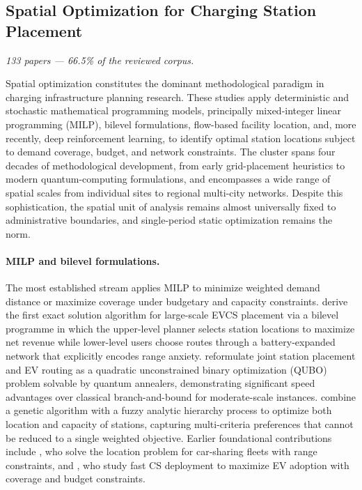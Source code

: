 \documentclass[12pt,letterpaper]{article}
\begin{document}
\subsection{Spatial Optimization for Charging Station Placement}

\textit{133 papers --- 66.5\% of the reviewed corpus.}

Spatial optimization constitutes the dominant methodological paradigm in
charging infrastructure planning research.  These studies apply
deterministic and stochastic mathematical programming models, principally
mixed-integer linear programming (MILP), bilevel formulations,
flow-based facility location, and, more recently, deep reinforcement
learning, to identify optimal station locations subject to demand
coverage, budget, and network constraints.  The cluster spans four
decades of methodological development, from early grid-placement
heuristics to modern quantum-computing formulations, and encompasses a
wide range of spatial scales from individual sites to regional multi-city
networks.  Despite this sophistication, the spatial unit of analysis
remains almost universally fixed to administrative boundaries, and
single-period static optimization remains the norm.

\paragraph{MILP and bilevel formulations.}
The most established stream applies MILP to minimize weighted demand
distance or maximize coverage under budgetary and capacity constraints.
\citet{nankali2025} derive the first exact solution algorithm for
large-scale EVCS placement via a bilevel programme in which the
upper-level planner selects station locations to maximize net revenue
while lower-level users choose routes through a battery-expanded network
that explicitly encodes range anxiety.  \citet{okada2025} reformulate
joint station placement and EV routing as a quadratic unconstrained
binary optimization (QUBO) problem solvable by quantum annealers,
demonstrating significant speed advantages over classical branch-and-bound
for moderate-scale instances.  \citet{choi2025} combine a genetic
algorithm with a fuzzy analytic hierarchy process to optimize both
location and capacity of stations, capturing multi-criteria preferences
that cannot be reduced to a single weighted objective.  Earlier
foundational contributions include \citet{brandstatter2020}, who solve
the location problem for car-sharing fleets with range constraints, and
\citet{anjos2020}, who study fast CS deployment to maximize EV adoption
with coverage and budget constraints.
\end{document}
